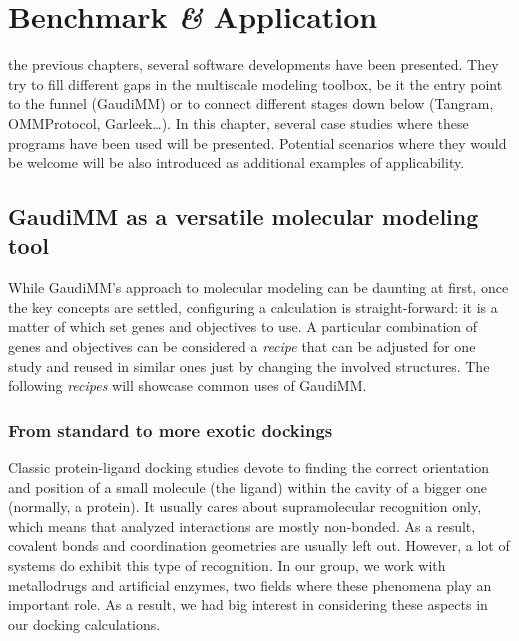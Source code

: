 

\chapter{Benchmark \textit{\&} Application}
\label{chap:06}

 the previous chapters, several software developments have been presented. They try to fill different gaps in the multiscale modeling toolbox, be it the entry point to the funnel (GaudiMM) or to connect different stages down below (Tangram, OMMProtocol, Garleek\ldots). In this chapter, several case studies where these programs have been used will be presented. Potential scenarios where they would be welcome will be also introduced as additional examples of applicability.

\section{GaudiMM as a versatile molecular modeling tool}

While GaudiMM's approach to molecular modeling can be daunting at first, once the key concepts are settled, configuring a calculation is straight-forward: it is a matter of which set genes and objectives to use. A particular combination of genes and objectives can be considered a \textit{recipe} that can be adjusted for one study and reused in similar ones just by changing the involved structures. The following \textit{recipes} will showcase common uses of GaudiMM.

\subsection{From standard to more exotic dockings}
\label{section:proteinliganddocking}
Classic protein-ligand docking studies devote to finding the correct orientation and position of a small molecule (the ligand) within the cavity of a bigger one (normally, a protein). It usually cares about supramolecular recognition only, which means that analyzed interactions are mostly non-bonded. As a result, covalent bonds and coordination geometries are usually left out. However, a lot of systems do exhibit this type of recognition. In our group, we work with metallodrugs and artificial enzymes, two fields where these phenomena play an important role. As a result, we had big interest in considering these aspects in our docking calculations.

